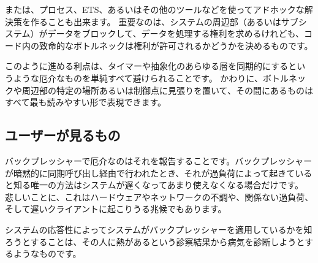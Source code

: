 または、プロセス、ETS、あるいはその他のツールなどを使ってアドホックな解決策を作ることも出来ます。
重要なのは、システムの周辺部（あるいはサブシステム）がデータをブロックして、データを処理する権利を求めるけれども、コード内の致命的なボトルネックは権利が許可されるかどうかを決めるものです。

このように進める利点は、タイマーや抽象化のあらゆる層を同期的にするというような厄介なものを単純すべて避けられることです。
かわりに、ボトルネックや周辺部の特定の場所あるいは制御点に見張りを置いて、その間にあるものはすべて最も読みやすい形で表現できます。

\subsection{ユーザーが見るもの}

バックプレッシャーで厄介なのはそれを報告することです。バックプレッシャーが暗黙的に同期呼び出し経由で行われたとき、それが過負荷によって起きていると知る唯一の方法はシステムが遅くなってあまり使えなくなる場合だけです。
悲しいことに、これはハードウェアやネットワークの不調や、関係ない過負荷、そして遅いクライアントに起こりうる兆候でもあります。

システムの応答性によってシステムがバックプレッシャーを適用しているかを知ろうとすることは、その人に熱があるという診察結果から病気を診断しようとするようなものです。

